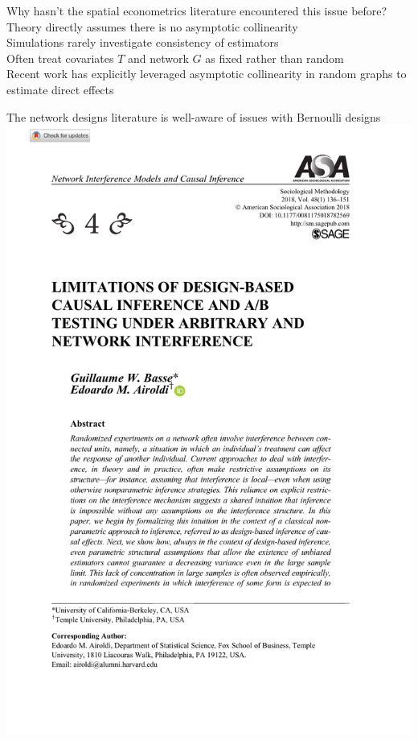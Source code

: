 \documentclass[aspectratio=169]{beamer}
\theoremstyle{remark}
\begin{document}
\begin{frame}{Why hasn't the spatial econometrics literature encountered this issue before?}
    Theory directly assumes there is no asymptotic collinearity \\
    \vspace{3mm}
    Simulations rarely investigate consistency of estimators \\
    \vspace{3mm}
    Often treat covariates $T$ and network $G$ as fixed rather than random \\
    \vspace{6mm}
    \footnotesize *Recent work has explicitly leveraged asymptotic collinearity in random graphs to estimate direct effects \citep{li2022f}
\end{frame}

\begin{frame}{The network designs literature is well-aware of issues with Bernoulli designs}
    \vfill
    \centering
    \includegraphics[height=0.9\textheight, page=1, trim={1.5cm 4cm 2cm 5cm}, clip]{./papers/airoldi.pdf}
\end{frame}
\end{document}
